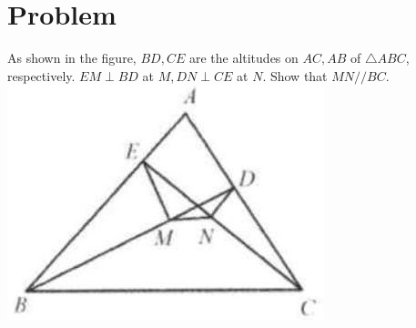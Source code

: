 \documentclass{article}
\begin{document}
\section*{Problem}
As shown in the figure, \(B D, C E\) are the altitudes on \(A C, A B\) of \(\triangle A B C\), respectively. \(E M \perp B D\) at \(M, D N \perp C E\) at \(N\). Show that \(M N / / B C\).\\
\centering
\includegraphics[width=\textwidth]{images/207(3).jpg}
\end{document}
